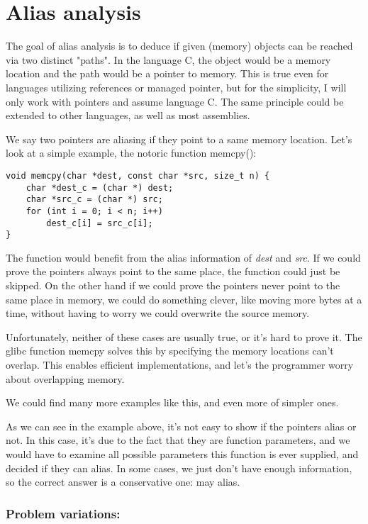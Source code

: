 \chapter{Alias analysis}

The goal of alias analysis is to deduce if given (memory) objects can be reached
via two distinct "paths". In the language C, the object would be a memory
location and the path would be a pointer to memory. This is true even for
languages utilizing references or managed pointer, but for the simplicity, I
will only work with pointers and assume language C. The same principle could be
extended to other languages, as well as most assemblies.

We say two pointers are aliasing if they point to a same memory location. Let's
look at a simple example, the notoric function memcpy():

\begin{verbatim}
void memcpy(char *dest, const char *src, size_t n) {
    char *dest_c = (char *) dest;
    char *src_c = (char *) src;
    for (int i = 0; i < n; i++)
        dest_c[i] = src_c[i];
}
\end{verbatim}

The function would benefit from the alias information of {\it dest} and {\it
src}. If we could prove the pointers always point to the same place, the
function could just be skipped. On the other hand if we could prove the pointers
never point to the same place in memory, we could do something clever, like
moving more bytes at a time, without having to worry we could overwrite the
source memory.

Unfortunately, neither of these cases are usually true, or it's hard to prove
it. The glibc function memcpy solves this by specifying the memory locations
can't overlap. This enables efficient implementations, and let's the programmer
worry about overlapping memory.

We could find many more examples like this, and even more of simpler ones.

As we can see in the example above, it's not easy to show if the pointers alias
or not. In this case, it's due to the fact that they are function parameters,
and we would have to examine all possible parameters this function is ever
supplied, and decided if they can alias. In some cases, we just don't have
enough information, so the correct answer is a conservative one: may alias.

\subsection{Problem variations: }

